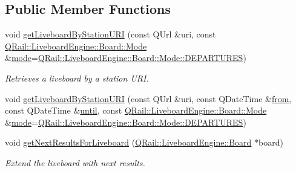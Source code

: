 \subsection*{Public Member Functions}
\begin{DoxyCompactItemize}
\item 
void \mbox{\hyperlink{classQRail_1_1LiveboardEngine_1_1Factory_adc3e3cb8c87171641f33f77367074a02}{get\+Liveboard\+By\+Station\+U\+RI}} (const Q\+Url \&uri, const \mbox{\hyperlink{classQRail_1_1LiveboardEngine_1_1Board_a0ab6d318f405895f62c6e98cb2d86c6e}{Q\+Rail\+::\+Liveboard\+Engine\+::\+Board\+::\+Mode}} \&\mbox{\hyperlink{classQRail_1_1LiveboardEngine_1_1Factory_a03deeb607999848d402a5a3af40967f4}{mode}}=\mbox{\hyperlink{classQRail_1_1LiveboardEngine_1_1Board_a0ab6d318f405895f62c6e98cb2d86c6ea560e6dfa758a32c703224545b841a386}{Q\+Rail\+::\+Liveboard\+Engine\+::\+Board\+::\+Mode\+::\+D\+E\+P\+A\+R\+T\+U\+R\+ES}})
\begin{DoxyCompactList}\small\item\em Retrieves a liveboard by a station U\+RI. \end{DoxyCompactList}\item 
void \mbox{\hyperlink{classQRail_1_1LiveboardEngine_1_1Factory_a3fc799d424334fe21be54a3cba0853be}{get\+Liveboard\+By\+Station\+U\+RI}} (const Q\+Url \&uri, const Q\+Date\+Time \&\mbox{\hyperlink{classQRail_1_1LiveboardEngine_1_1Factory_a883b4e0b9af113d312c6828b64d07258}{from}}, const Q\+Date\+Time \&\mbox{\hyperlink{classQRail_1_1LiveboardEngine_1_1Factory_a040529d305e2cc4d19b68f48817f7a90}{until}}, const \mbox{\hyperlink{classQRail_1_1LiveboardEngine_1_1Board_a0ab6d318f405895f62c6e98cb2d86c6e}{Q\+Rail\+::\+Liveboard\+Engine\+::\+Board\+::\+Mode}} \&\mbox{\hyperlink{classQRail_1_1LiveboardEngine_1_1Factory_a03deeb607999848d402a5a3af40967f4}{mode}}=\mbox{\hyperlink{classQRail_1_1LiveboardEngine_1_1Board_a0ab6d318f405895f62c6e98cb2d86c6ea560e6dfa758a32c703224545b841a386}{Q\+Rail\+::\+Liveboard\+Engine\+::\+Board\+::\+Mode\+::\+D\+E\+P\+A\+R\+T\+U\+R\+ES}})
\item 
void \mbox{\hyperlink{classQRail_1_1LiveboardEngine_1_1Factory_ad769a2f6bcfe1b411d83bd59bc4bc83b}{get\+Next\+Results\+For\+Liveboard}} (\mbox{\hyperlink{classQRail_1_1LiveboardEngine_1_1Board}{Q\+Rail\+::\+Liveboard\+Engine\+::\+Board}} $\ast$board)
\begin{DoxyCompactList}\small\item\em Extend the liveboard with next results. \end{DoxyCompactList}\item 

\end{DoxyCompactItemize}
